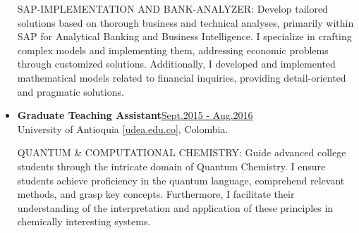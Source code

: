 \begin{itemize}
              {\noindent
                  \uppercase{SAP-Implementation and Bank-Analyzer:}
                  Develop tailored solutions based on thorough business and technical analyses, primarily within SAP for Analytical Banking and Business Intelligence. I specialize in crafting complex models and implementing them, addressing economic problems through customized solutions. Additionally, I developed and implemented mathematical models related to financial inquiries, providing detail-oriented and pragmatic solutions.
              }

    \item \textbf{\large Graduate Teaching Assistant}\hfill \href{.}{Sept.2015 - Aug.2016}\\
          University of Antioquia [\href{www.udea.edu.co}{udea.edu.co}],
          Colombia.

              {\noindent
                  \uppercase{Quantum \& Computational Chemistry:}
                  Guide advanced college students through the intricate domain of Quantum Chemistry. I ensure students achieve proficiency in the quantum language, comprehend relevant methods, and grasp key concepts. Furthermore, I facilitate their understanding of the interpretation and application of these principles in chemically interesting systems.
              }

\end{itemize}
